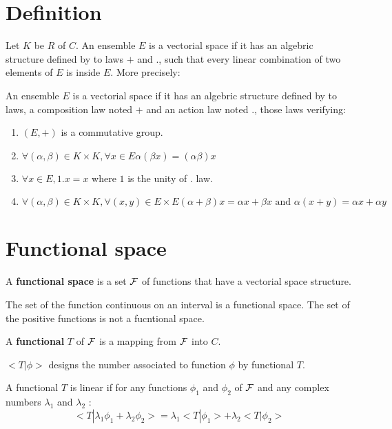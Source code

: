 \documentclass[12pt]{book}
\begin{document}
\section{Definition}
Let $K$ be $R$ of $C$. An ensemble $E$ is a vectorial space if it has
an algebric structure defined by to laws $+$ and $.$, such that every
linear combination of two elements of $E$ is inside $E$.
More precisely:

\begin{defn}
An ensemble $E$ is a vectorial space if it has
an algebric structure defined by to laws, a composition law noted  $+$
and an action law noted $.$, those laws verifying:
\begin{enumerate}
\item $(E,+)$ is a commutative group.
\item 
$\forall (\alpha,\beta)\in K\times K, \forall x\in E 
\alpha(\beta x)=(\alpha\beta) x$
\item $\forall x\in E ,1.x=x$ where $1$ is the unity of $.$ law.

\item $\forall (\alpha,\beta)\in K\times K, \forall (x,y)\in E\times E 
(\alpha+\beta) x=\alpha x+\beta x \mbox{ and } \alpha(x+y)=\alpha x+\alpha y
$
\end{enumerate}
\end{defn}


\section{Functional space}
\begin{defn}
A {\bf functional space} is a set ${\cal F}$ of functions that have a
vectorial space 
structure.
\end{defn}
The set of the function continuous on an interval is a functional
space. The set of the positive functions is not a fucntional space.
\begin{defn}
A {\bf functional}  $T$ of ${\cal F}$ is a mapping from ${\cal F}$ into $C$.
\end{defn}
 $<T|\phi>$ designs the number associated to function $\phi$ by functional
 $T$. 
\begin{defn}
A functional $T$ is linear if for any functions $\phi_1$ and
$\phi_2$ of ${\cal F}$ and any complex numbers $\lambda_1$ and
$\lambda_2$ :
\begin{equation}
<T|\lambda_1\phi_1+\lambda_2\phi_2> =
\lambda_1<T|\phi_1>+\lambda_2<T|\phi_2> 
\end{equation}
\end{defn}
\end{document}
